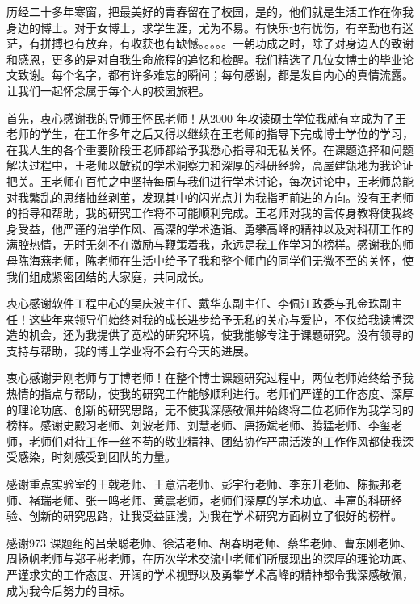 
历经二十多年寒窗，把最美好的青春留在了校园，是的，他们就是生活工作在你我身边的博士。对于女博士，求学生涯，尤为不易。有快乐也有忧伤，有辛勤也有迷茫，有拼搏也有放弃，有收获也有缺憾。。。。。一朝功成之时，除了对身边人的致谢和感恩，更多的是对自我生命旅程的追忆和检醒。我们精选了几位女博士的毕业论文致谢。每个名字，都有许多难忘的瞬间；每句感谢，都是发自内心的真情流露。让我们一起怀念属于每个人的校园旅程。

首先，衷心感谢我的导师王怀民老师！从2000 年攻读硕士学位我就有幸成为了王老师的学生，在工作多年之后又得以继续在王老师的指导下完成博士学位的学习，在我人生的各个重要阶段王老师都给予我悉心指导和无私关怀。在课题选择和问题解决过程中，王老师以敏锐的学术洞察力和深厚的科研经验，高屋建瓴地为我论证把关。王老师在百忙之中坚持每周与我们进行学术讨论，每次讨论中，王老师总能对我繁乱的思绪抽丝剥茧，发现其中的闪光点并为我指明前进的方向。没有王老师的指导和帮助，我的研究工作将不可能顺利完成。王老师对我的言传身教将使我终身受益，他严谨的治学作风、高深的学术造诣、勇攀高峰的精神以及对科研工作的满腔热情，无时无刻不在激励与鞭策着我，永远是我工作学习的榜样。感谢我的师母陈海燕老师，陈老师在生活中给予了我和整个师门的同学们无微不至的关怀，使我们组成紧密团结的大家庭，共同成长。

衷心感谢软件工程中心的吴庆波主任、戴华东副主任、李佩江政委与孔金珠副主任！这些年来领导们始终对我的成长进步给予无私的关心与爱护，不仅给我读博深造的机会，还为我提供了宽松的研究环境，使我能够专注于课题研究。没有领导的支持与帮助，我的博士学业将不会有今天的进展。

衷心感谢尹刚老师与丁博老师！在整个博士课题研究过程中，两位老师始终给予我热情的指点与帮助，使我的研究工作能够顺利进行。老师们严谨的工作态度、深厚的理论功底、创新的研究思路，无不使我深感敬佩并始终将二位老师作为我学习的榜样。感谢史殿习老师、刘波老师、刘慧老师、唐扬斌老师、腾猛老师、李玺老师，老师们对待工作一丝不苟的敬业精神、团结协作严肃活泼的工作作风都使我深受感染，时刻感受到团队的力量。

感谢重点实验室的王戟老师、王意洁老师、彭宇行老师、李东升老师、陈振邦老师、褚瑞老师、张一鸣老师、黄震老师，老师们深厚的学术功底、丰富的科研经验、创新的研究思路，让我受益匪浅，为我在学术研究方面树立了很好的榜样。

感谢973 课题组的吕荣聪老师、徐洁老师、胡春明老师、蔡华老师、曹东刚老师、周扬帆老师与郑子彬老师，在历次学术交流中老师们所展现出的深厚的理论功底、严谨求实的工作态度、开阔的学术视野以及勇攀学术高峰的精神都令我深感敬佩，成为我今后努力的目标。

